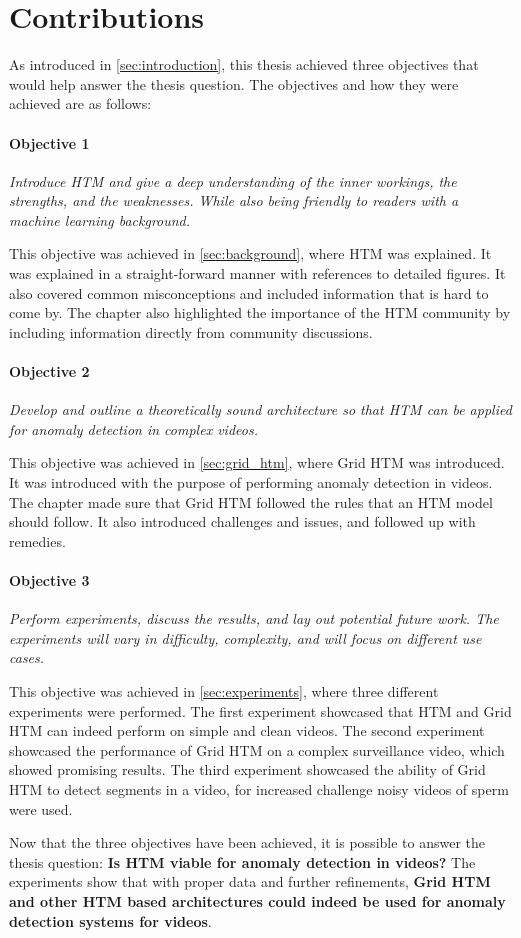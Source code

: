 \section{Contributions}
As introduced in \autoref{sec:introduction}, this thesis achieved three objectives that would help answer the thesis question. The objectives and how they were achieved are as follows:
\par
\paragraph*{Objective 1} \emph{Introduce HTM and give a deep understanding of the inner workings, the strengths, and the weaknesses. While also being friendly to readers with a machine learning background.}
\par
This objective was achieved in \autoref{sec:background}, where HTM was explained. It was explained in a straight-forward manner with references to detailed figures. It also covered common misconceptions and included information that is hard to come by. The chapter also highlighted the importance of the HTM community by including information directly from community discussions.
\paragraph*{Objective 2} \emph{Develop and outline a theoretically sound architecture so that HTM can be applied for anomaly detection in complex videos.}
\par
This objective was achieved in \autoref{sec:grid_htm}, where Grid HTM was introduced. It was introduced with the purpose of performing anomaly detection in videos. The chapter made sure that Grid HTM followed the rules that an HTM model should follow. It also introduced challenges and issues, and followed up with remedies.
\paragraph*{Objective 3} \emph{Perform experiments, discuss the results, and lay out potential future work. The experiments will vary in difficulty, complexity, and will focus on different use cases.}
\par
This objective was achieved in \autoref{sec:experiments}, where three different experiments were performed. The first experiment showcased that HTM and Grid HTM can indeed perform on simple and clean videos. The second experiment showcased the performance of Grid HTM on a complex surveillance video, which showed promising results. The third experiment showcased the ability of Grid HTM to detect segments in a video, for increased challenge noisy videos of sperm were used.
\par
Now that the three objectives have been achieved, it is possible to answer the thesis question: \textbf{Is HTM viable for anomaly detection in videos?} The experiments show that with proper data and further refinements, \textbf{Grid HTM and other HTM based architectures could indeed be used for anomaly detection systems for videos}.
